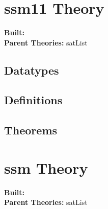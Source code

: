 \documentclass[11pt, twoside]{article}
\begin{document}





\tableofcontents
\cleardoublepage
\HOLpagestyle

\section{ssm11 Theory}
\begin{flushleft}
\textbf{Built:} \HOLssmOneOneDate \\[2pt]
\textbf{Parent Theories:} satList
\end{flushleft}

\subsection{Datatypes}

\HOLssmOneOneDatatypes

\subsection{Definitions}

\HOLssmOneOneDefinitions

\subsection{Theorems}

\HOLssmOneOneTheorems

\section{ssm Theory}
\begin{flushleft}
\textbf{Built:} \HOLssmDate \\[2pt]
\textbf{Parent Theories:} satList
\end{flushleft}
\end{document}
